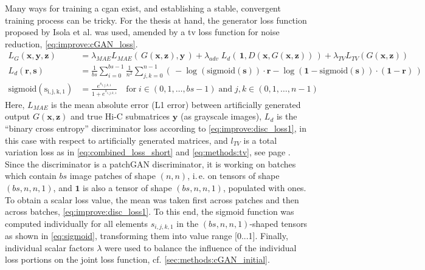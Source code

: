 Many ways for training a \acrshort{cgan} exist, and establishing a stable, convergent training process can be tricky.
For the thesis at hand, the generator loss function proposed by Isola et al. \cite{Isola2017} was used, 
amended by a \acrshort{tv} loss function for noise reduction, \cref{eq:improve:cGAN_loss}.
\begin{align}
 L_G(\mathbf{x}, \mathbf{y}, \mathbf{z}) &=\lambda_\mathit{MAE}L_\mathit{MAE}(\,G(\mathbf{x},\mathbf{z}), \mathbf{y}\,) 
    + \lambda_\mathit{adv} \; L_d(\, \mathbf{1}, D(\mathbf{x}, G(\mathbf{x},\mathbf{z})) \,) 
    +  \lambda_\mathit{TV}L_\mathit{TV}(G(\mathbf{x},\mathbf{z})) \label{eq:improve:cGAN_loss}\\
 L_d(\mathbf{r, s}) &= \frac{1}{bs}\sum_{i=0}^{bs-1} \frac{1}{n^2}\sum_{j,k=0}^{n-1}
    \left(\, -\log(\mathrm{sigmoid}(\bm{s})) \cdot \bm{r} - \log(\bm{1} - \mathrm{sigmoid}(\bm{s})) \cdot (\bm{1} - \bm{r}) \,\right) \label{eq:improve:disc_loss1}\\
 \mathrm{sigmoid(s_{i,j,k,1})} &= \frac{e^{s_{i,j,k,1}}}{1+e^{s_{i,j,k,1}}} \quad \mathrm{for}\; i \in (0, 1, \dots, bs-1)\; \textrm{and}\; j,k \in (0, 1, \dots, n-1) \label{eq:sigmoid}
\end{align}
Here, $L_\mathit{MAE}$ is the mean absolute error (L1 error) between artificially generated output $G(\bm{x},\bm{z})$ and true Hi-C submatrices $\bm{y}$ (as grayscale images), 
$L_d$ is the ``binary cross entropy'' discriminator loss according to \cref{eq:improve:disc_loss1}, in this case with respect to artificially generated matrices, and 
$l_\mathit{TV}$ is a total variation loss as in \cref{eq:combined_loss_short} and \cref{eq:methods:tv}, see page \pageref{eq:methods:tv}.
Since the discriminator is a patchGAN discriminator, it is working on batches which contain $bs$ image patches of shape $(n,n)$, i.\,e. on tensors of shape $(bs,n,n,1)$, 
and $\mathbf{1}$ is also a tensor of shape $(bs,n,n,1)$, populated with ones.
To obtain a scalar loss value, the mean was taken first across patches and then across batches, \cref{eq:improve:disc_loss1}. 
To this end, the sigmoid function was computed individually for all elements $s_{i,j,k,1}$ in the $(bs,n,n,1)$-shaped tensors as shown in \cref{eq:sigmoid}, 
transforming them into value range [0...1].
Finally, individual scalar factors $\lambda$ were used to balance the influence of the individual loss portions on the joint loss function, cf. \cref{sec:methods:cGAN_initial}.


